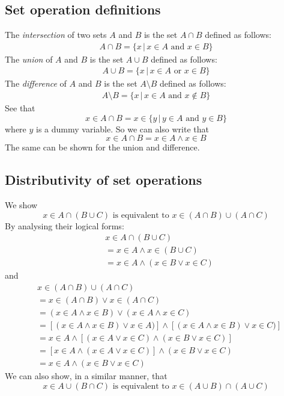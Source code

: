 \documentclass{report}
\theoremstyle{definition}
\begin{document}
\subsection{Set operation definitions}
The \textit{intersection} of two sets $A$ and $B$ is the set $A\cap B$ defined as follows:
\begin{align*}
A\cap B=\{x\,|\,x\in A\text{ and }x\in B\}
\end{align*}
The \textit{union} of $A$ and $B$ is the set $A\cup B$ defined as follows:
\begin{align*}
A\cup B=\{x\,|\,x\in A\text{ or }x\in B\}
\end{align*}
The \textit{difference} of $A$ and $B$ is the set $A\setminus B$ defined as follows:
\begin{align*}
A\setminus B=\{x\,|\,x\in A\text{ and }x\notin B\}
\end{align*}
See that 
\begin{equation*}
x\in A\cap B=x\in\{y\,|\,y\in A\text{ and }y\in B\}
\end{equation*}
where $y$ is a dummy variable. So we can also write that
\begin{equation*}
x\in A\cap B=x\in A\land x\in B
\end{equation*}
The same can be shown for the union and difference.

\subsection{Distributivity of set operations}
We show \begin{equation*} x\in A\cap(B\cup C)\text{ is equivalent to }
x\in(A\cap B)\cup(A\cap C)
\end{equation*}
By analysing their logical forms:
\begin{align*}
&x\in A\cap(B\cup C)\\
&=x\in A\land x\in(B\cup C)\\
&=x\in A\land(x\in B\lor x\in C)
\end{align*}
and
\begin{align*}
&x\in(A\cap B)\cup(A\cap C)\\
&=x\in(A\cap B)\lor x\in(A\cap C)\\
&=(x\in A\land x\in B)\lor(x\in A\land x\in C)\\
&=[(x\in A\land x\in B)\lor x\in A)]\land[(x\in A\land x\in B)\lor x\in C)]\\
&=x\in A\land[(x\in A\lor x\in C)\land(x\in B\lor x\in C)]\\
&=[x\in A\land(x\in A\lor x\in C)]\land(x\in B\lor x\in C)\\
&=x\in A\land(x\in B\lor x\in C)
\end{align*}
We can also show, in a similar manner, that
\begin{equation*}
x\in A\cup(B\cap C)\text{ is equivalent to }
x\in(A\cup B)\cap(A\cup C)
\end{equation*}
\newpage
\end{document}
